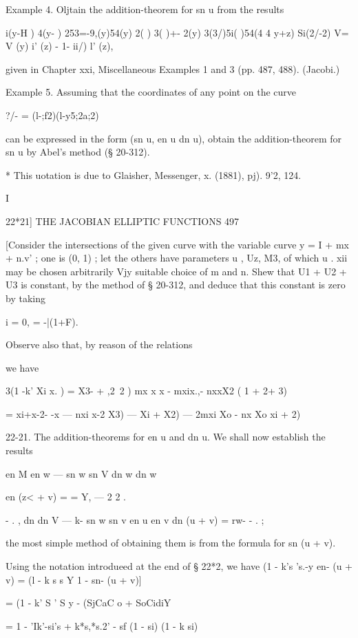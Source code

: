 Example 4. Oljtain the addition-theorem for sn u from the results

 i(y-H ) 4(y- ) 253=-9,(y)54(y) 2( ) 3( )+- 2(y) 3(3/)5i( )54(4 4 y+z)
Si(2/-2) V= V (y) i' (z) - 1- ii/) l' (z),

given in Chapter xxi, Miscellaneous Examples 1 and 3 (pp. 487, 488).
(Jacobi.)

Example 5. Assuming that the coordinates of any point on the curve

?/- = (l-;f2)(l-y5;2a;2)

can be expressed in the form (sn u, en u dn u), obtain the
addition-theorem for sn u by Abel's method (§ 20-312).

* This uotation is due to Glaisher, Messenger, x. (1881), pj). 9'2,
124.



I



22*21] THE JACOBIAN ELLIPTIC FUNCTIONS 497

[Consider the intersections of the given curve with the variable curve
y = I + mx + n.v' ; one is (0, 1) ; let the others have parameters u ,
Uz, M3, of which u . xii may be chosen arbitrarily Vjy suitable choice
of m and n. Shew that U1 + U2 + U3 is constant, by the method of §
20-312, and deduce that this constant is zero by taking

 i = 0, = -|(1+F).

Observe also that, by reason of the relations

we have

 3(1 -k' Xi x. ) = X3- + ,2\ 2 ) mx x x - mxix.,- nxxX2 ( 1 + 2+ 3)

= xi+x-2- -x — nxi x-2 X3) — Xi + X2) — 2mxi Xo - nx Xo xi + 2)

22-21. The addition-theorems for en u and dn u. We shall now establish
the results

en M en w — sn w sn V dn w dn w

en (z< + v) = = Y, — 2 2 .

- . , dn dn V — k- sn w sn v en u en v dn (u + v) = rw- - . ;

the most simple method of obtaining them is from the formula for sn (u
+ v).

Using the notation introdueed at the end of § 22*2, we have (1 - k's
's.-y en- (u + v) = (l - k s s Y 1 - sn- (u + v)]

= (1 - k' S ' S y - (SjCaC o + SoCidiY

= 1 - 'Ik'-si's + k*s,*s.2' - sf (1 - si) (1 - k si)

